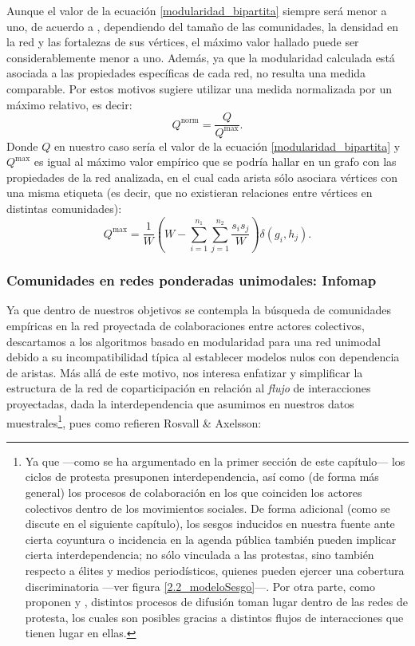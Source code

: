 \documentclass[letterpaper, 11pt]{book}
\theoremstyle{definition}
\theoremstyle{remark}
\begin{document}
Aunque el valor de la ecuación \ref{modularidad_bipartita} siempre será menor a uno, de acuerdo a \citet{2010_Newman_Networks}, dependiendo del tamaño de las comunidades, la densidad en la red y las fortalezas de sus vértices, el máximo valor hallado puede ser considerablemente menor a uno. 
Además, ya que la modularidad calculada está asociada a las propiedades específicas de cada red, no resulta una medida comparable. 
Por estos motivos \citet{2016_Beckett_ComunidadesBipatitas} sugiere utilizar una medida normalizada por un máximo relativo, es decir:
\begin{equation}\label{modularidad_normalizada}
Q^{\text{norm}} = \frac{Q}{Q^{\text{max}}}.
\end{equation} 
Donde $Q$ en nuestro caso sería el valor de la ecuación \ref{modularidad_bipartita} y  $Q^{\text{max}}$ es igual al máximo valor empírico  que se podría hallar en un grafo con las propiedades de la red analizada, en el cual cada arista sólo asociara vértices con una misma etiqueta (es decir, que no existieran relaciones entre vértices en distintas comunidades): 
\begin{equation}\label{modularidad_max}
Q^{\text{max}} = \frac{1}{W} \left(W - \sum_{i=1}^{n_{1}} \sum_{j=1}^{n_{2}} \frac{s_{i}s_{j}}{W}  \right) \delta(g_{i},h_{j}).
\end{equation} 






\subsubsection{Comunidades en redes ponderadas unimodales: Infomap}
\label{sec:infomap}

Ya que dentro de nuestros objetivos se contempla la búsqueda de comunidades empíricas en la red proyectada de colaboraciones entre actores colectivos, descartamos a los algoritmos basado en modularidad para una red unimodal debido a su incompatibilidad típica al establecer modelos nulos con dependencia de aristas. 
Más allá de este motivo, nos interesa enfatizar y simplificar la estructura de la red de coparticipación en relación al \emph{flujo} de interacciones proyectadas, dada la interdependencia que asumimos en nuestros datos muestrales\footnote{
    Ya que ---como se ha argumentado en la primer sección de este capítulo--- los ciclos de protesta presuponen interdependencia, así como (de forma más general) los procesos de colaboración en los que coinciden los actores colectivos dentro de los movimientos sociales. 
    De forma adicional (como se discute en el siguiente capítulo), los sesgos inducidos en nuestra fuente ante cierta coyuntura o incidencia en la agenda pública también pueden implicar cierta interdependencia; no sólo vinculada a las protestas, sino también respecto a élites y medios periodísticos, quienes pueden ejercer una cobertura discriminatoria ---ver figura \ref{2.2_modeloSesgo}---. 
    Por otra parte, como proponen \citet{2003_OliverMyers_Difusion} y \citet{2012_Wand_andSoule_ColabiracionOMS}, distintos procesos de difusión toman lugar dentro de las redes de protesta, los cuales son posibles gracias a distintos flujos de interacciones que tienen lugar en ellas.
}, pues como refieren Rosvall \& Axelsson:
\end{document}
